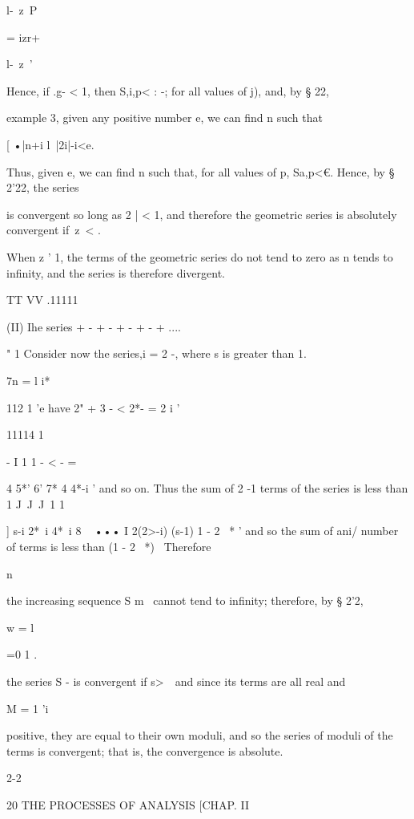 l-\ z\ P



= izr+



l-\ z\ '



Hence, if .g- < 1, then S,i,p< : -; for all values of j), and, by §
22,

example 3, given any positive number e, we can find n such that

[ •|n+i l\ |2i|-i<e.

Thus, given e, we can find n such that, for all values of p, Sa,p<€.
Hence, by § 2'22, the series

is convergent so long as 2 | < 1, and therefore the geometric series
is absolutely convergent if\ z\ < .

When z ' 1, the terms of the geometric series do not tend to zero as n
tends to infinity, and the series is therefore divergent.

TT VV .11111

(II) Ihe series + - + - + - + - + ....

" 1 Consider now the series,i = 2 -, where s is greater than 1.

7n = l i*

112 1 'e have 2" + 3 - < 2*- = 2 i '

11114 1

- I 1 1 - < - =

4 5*' 6' 7* 4 4*-i ' and so on. Thus the sum of 2 -1 terms of the
series is less than 1 J\ J\ J\ 1 1



] s-i 2*~i 4*~i 8 ~ ••• I 2(2>-i) (s-1) 1 - 2 ~* ' and so the sum of
ani/ number of terms is less than (1 - 2 ~*)~ Therefore

n

the increasing sequence S m~ cannot tend to infinity; therefore, by §
2'2,

w = l

=0 1 .

the series S - is convergent if s>\ \ and since its terms are all real
and

M = 1 'i

positive, they are equal to their own moduli, and so the series of
moduli of the terms is convergent; that is, the convergence is
absolute.

2-2



20 THE PROCESSES OF ANALYSIS [CHAP. II

